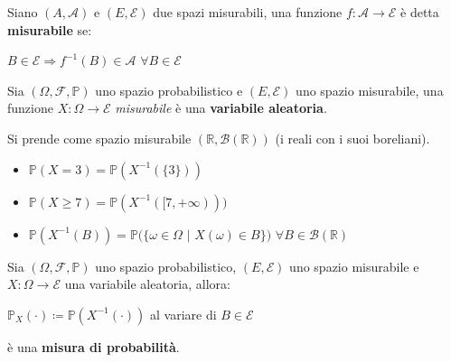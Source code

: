 \begin{definition}
    Siano $(A,\mathcal{A})$ e $(E,\mathcal{E})$ due spazi misurabili, una funzione $f:\mathcal{A}\longrightarrow\mathcal{E}$ è detta \textbf{misurabile} se:
    \begin{center}
         $B\in\mathcal{E} \Rightarrow f^{-1}(B)\in\mathcal{A}$ \hspace{4px} $\forall B\in\mathcal{E}$ 
    \end{center}
\end{definition}

\vspace{5px}

\begin{definition}
    Sia $(\Omega,\mathscr{F},\mathbb{P})$ uno spazio probabilistico e $(E,\mathcal{E})$ uno spazio misurabile, una funzione $X:\Omega\longrightarrow\mathcal{E}$ \textit{misurabile} è una \textbf{variabile aleatoria}.
\end{definition}

\vspace{10px}

\begin{example}
    Si prende come spazio misurabile $(\mathbb{R},\mathcal{B}(\mathbb{R}))$ (i reali con i suoi boreliani). 
    \begin{itemize}
        \item $\mathbb{P}(X=3)=\mathbb{P}(X^{-1}(\{3\}))$
        \item $\mathbb{P}(X\geq7)=\mathbb{P}(X^{-1}([7,+\infty)))$
        \item $\mathbb{P}(X^{-1}(B))=\mathbb{P}(\{\omega\in\Omega$ $|$ $X(\omega)\in B\})$ \hspace{4px} $\forall B\in\mathcal{B}(\mathbb{R})$
    \end{itemize}
\end{example}

\vspace{10px}

\begin{theorem}
    Sia $(\Omega,\mathscr{F},\mathbb{P})$ uno spazio probabilistico, $(E,\mathcal{E})$ uno spazio
    \newline
    misurabile e $X:\Omega\longrightarrow\mathcal{E}$ una variabile aleatoria, allora:
    \begin{center}
        $\mathbb{P}_X(\cdot)\coloneqq\mathbb{P}(X^{-1}(\cdot))$ al variare di $B\in\mathcal{E}$ 
    \end{center}
    è una \textbf{misura di probabilità}.
\end{theorem}

